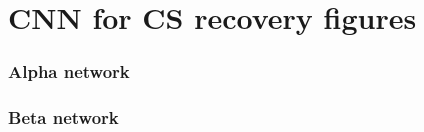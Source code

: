 \appendix
\chapter{CNN for CS recovery figures}

\subsection{Alpha network}

\subsection{Beta network}


